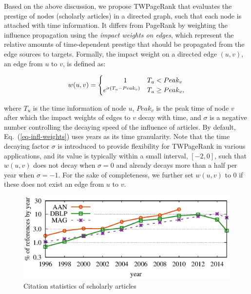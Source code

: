 Based on the above discussion, we propose TWPageRank that evaluates the prestige of nodes (\eg scholarly articles) in a directed graph, such that each node is attached with time information. It differs from PageRank by weighting the influence propagation using the {\em impact weights on edges}, which represent the relative amounts of time-dependent prestige that should be propagated from the edge sources to targets.
%
Formally, the impact weight on a directed edge $(u,v)$, \ie an edge from $u$ to $v$, is defined as:

\vspace{-2ex}
\begin{small}
\begin{equation} \label{eq-infl-weights}
w(u,v)  =  \begin{cases}  \hspace{7ex} 1 & T_u <  Peak_v \\
  e^{\sigma(T_u-Peak_v)} & T_u \geq Peak_v,
\end{cases}
\end{equation}
\end{small}
%
\noindent where $T_u$ is the time information of node $u$, $Peak_v$ is the peak time of node $v$ after which the impact weights of edges to $v$ decay with time, and $\sigma$ is a negative number controlling the decaying speed of the influence of articles.
By default, Eq.~(\ref{eq-infl-weights}) uses years as its time granularity. Note that the time decaying factor $\sigma$ is introduced to provide flexibility for TWPageRank in various applications, and its value is typically within a small interval, \eg $[-2,0]$, such that $w(u,v)$ does not decay when $\sigma=0$ and already decays more than a half per year when $\sigma=-1$.
For the sake of completeness, we further set $w(u,v)$ to $0$ if these does not exist an edge from $u$ to $v$.

\begin{figure}
\centering
\includegraphics[scale=0.5]{fig/yearly-references.eps}
\vspace{-2ex}
\caption{\small Citation statistics of scholarly articles}
\label{fig-reference}
\vspace{-3ex}
\end{figure}

